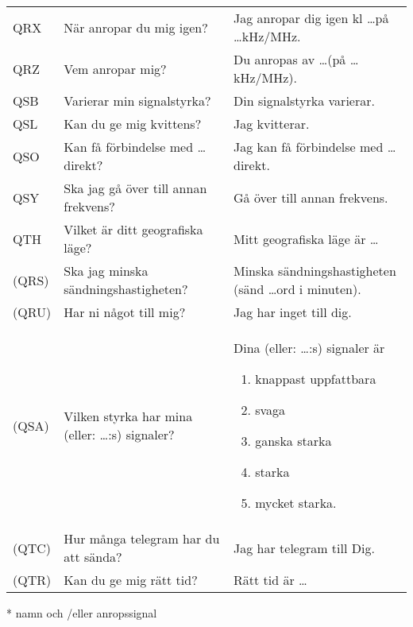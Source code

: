 \begin{table}
\begin{tabular}{lp{6cm}p{6cm}}
    \\
    QRX
    &
    När anropar du mig igen?
    &
    Jag anropar dig igen kl \dots på \dots kHz/MHz.
    \\
    QRZ
    &
    Vem anropar mig?
    &
    Du anropas av \dots * (på \dots kHz/MHz).
    \\
    QSB
    &
    Varierar min signalstyrka?
    &
    Din signalstyrka varierar.
    \\
    QSL
    &
    Kan du ge mig kvittens?
    &
    Jag kvitterar.
    \\
    QSO
    &
    Kan få förbindelse med \dots * direkt?
    &
    Jag kan få förbindelse med \dots * direkt.
    \\
    QSY
    &
    Ska jag gå över till annan frekvens?
    &
    Gå över till annan frekvens.
    \\
    QTH
    &
    Vilket är ditt geografiska läge?
    &
    Mitt geografiska läge är \dots
    \\
    (QRS)
    &
    Ska jag minska sändningshastigheten?
    &
    Minska sändningshastigheten
    (sänd \dots ord i minuten).
    \\
    (QRU)
    &
    Har ni något till mig?
    &
    Jag har inget till dig.
    \\
    (QSA)
    &
    Vilken styrka har mina
    (eller: \dots *:s) signaler?
    &
    Dina (eller: \dots *:s) signaler är
    \vspace{-\topsep}
    \begin{enumerate}[noitemsep]
    	\item knappast uppfattbara
    	\item svaga
    	\item ganska starka
    	\item starka
    	\item mycket starka.
    \end{enumerate}
    \\
    (QTC)
    &
    Hur många telegram har du att sända?
    &
    Jag har telegram till Dig.
    \\
    (QTR)
    &
    Kan du ge mig rätt tid?
    &
    Rätt tid är \dots
    \\
  \end{tabular}
* namn och /eller anropssignal
\end{table}

